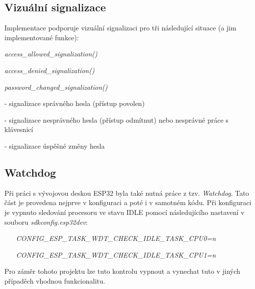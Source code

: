 \documentclass[a4paper, 12pt]{article}
\begin{document}
\subsection{Vizuální signalizace}
Implementace podporuje vizuální signalizaci pro tři následující situace (a jim implementované funkce):

\begin{itemize}
\begin{minipage}{0.45\linewidth}   
        \item \textit{access\_allowed\_signalization()}   
        \vspace{0.5cm}
        \item \textit{access\_denied\_signalization()}
        \vspace{0.5cm}
        \vspace{0.5cm}
        \item \textit{password\_changed\_signalization()}
    \end{minipage}
    \begin{minipage}{0.4\linewidth}
        \item[-] signalizace správného hesla (přístup povolen)
        \item[-] signalizace nesprávného hesla (přístup odmítnut) nebo nesprávné práce s klávesnicí
        \item[-] signalizace úspěšné změny hesla
    \end{minipage}
\end{itemize}

\subsection{Watchdog}
Při práci s vývojovou deskou ESP32 byla také nutná práce z tzv. \textit{Watchdog}. Tato část je provedena nejprve v konfiguraci a poté i v samotném kódu. Při konfiguraci je vypnuto sledování procesoru ve stavu IDLE pomocí následujícího nastavení v souboru \textit{sdkconfig.esp32dev}:

\begin{itemize}
    \item[] \textit{CONFIG\_ESP\_TASK\_WDT\_CHECK\_IDLE\_TASK\_CPU0=n}
    \item[] \textit{CONFIG\_ESP\_TASK\_WDT\_CHECK\_IDLE\_TASK\_CPU1=n}
\end{itemize}

Pro záměr tohoto projektu lze tuto kontrolu vypnout a vynechat tuto v jiných případěch vhodnou funkcionalitu.
\end{document}
